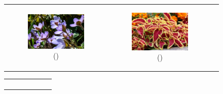 \documentclass{BachelorBUI}
\begin{document}
\begin{figure}[!h]
\begin{tabular}{ccc}
\begin{subfigure}{0.30\textwidth}
                    \centering
                    \includegraphics[width=\textwidth]{8_artificial_background.jpg}
                    \caption{\centering (\cite{8_artificial_background:2009})}
                \end{subfigure} &
                \begin{subfigure}{0.30\textwidth}
                    \centering
                    \includegraphics[width=\textwidth]{9_artificial_background.jpg}
                    \caption{\centering (\cite{9_artificial_background:2016})}
                \end{subfigure} \\
            \end{tabular}
            \begin{tabular}{c}
                \begin{subfigure}{0.30\textwidth}
                    \centering

\end{subfigure}
\end{tabular}
\end{figure}
\end{document}
